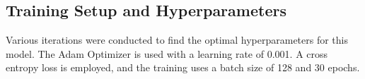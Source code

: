 \documentclass{article} %
\begin{document}
\subsection{Training Setup and Hyperparameters}
Various iterations were conducted to find the optimal hyperparameters for this model. The Adam Optimizer is used with a learning rate of 0.001. A cross entropy loss is employed, and the training uses a batch size of 128 and 30 epochs. 


\end{document}
